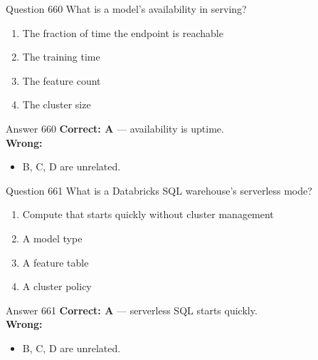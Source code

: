 \documentclass[aspectratio=169,11pt]{beamer}
\begin{document}
	\begin{frame}{Question 660}
		What is a model's availability in serving?
		\begin{enumerate}[label=\Alph*.]
			\item The fraction of time the endpoint is reachable
			\item The training time
			\item The feature count
			\item The cluster size
		\end{enumerate}
	\end{frame}
	\begin{frame}{Answer 660}
		\textbf{Correct: A} --- availability is uptime.\\
		\vspace{0.5em}
		\textbf{Wrong:}
		\begin{itemize}
			\item B, C, D are unrelated.
		\end{itemize}
	\end{frame}
	
	\begin{frame}{Question 661}
		What is a Databricks SQL warehouse's serverless mode?
		\begin{enumerate}[label=\Alph*.]
			\item Compute that starts quickly without cluster management
			\item A model type
			\item A feature table
			\item A cluster policy
		\end{enumerate}
	\end{frame}
	\begin{frame}{Answer 661}
		\textbf{Correct: A} --- serverless SQL starts quickly.\\
		\vspace{0.5em}
		\textbf{Wrong:}
		\begin{itemize}
			\item B, C, D are unrelated.
		\end{itemize}
	\end{frame}
	
\end{document}
